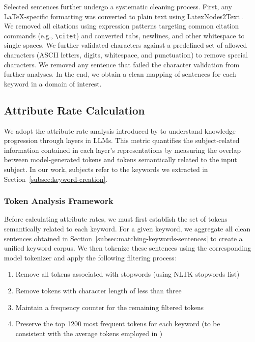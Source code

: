 \documentclass[10pt]{article}
\begin{document}
Selected sentences further undergo a systematic cleaning process. First, any LaTeX-specific formatting was converted to plain text using LatexNodes2Text \citep{faist_pylatexenc_2021}. We removed all citations using expression patterns targeting common citation commands (e.g., \verb|\citet|) and converted tabs, newlines, and other whitespace to single spaces. We further validated characters against a predefined set of allowed characters (ASCII letters, digits, whitespace, and punctuation) to remove special characters. We removed any sentence that failed the character validation from further analyses. In the end, we obtain a clean mapping of sentences for each keyword in a domain of interest.




\subsection{Attribute Rate Calculation}
\label{subsec:attribution-rate}

We adopt the attribute rate analysis introduced by \citet{geva2023dissecting} to understand knowledge progression through layers in LLMs. This metric quantifies the subject-related information contained in each layer's representations by measuring the overlap between model-generated tokens and tokens semantically related to the input subject. In our work, subjects refer to the keywords we extracted in Section~\ref{subsec:keyword-creation}.

\subsubsection{Token Analysis Framework}
\label{subsec:token-analysis}

Before calculating attribute rates, we must first establish the set of tokens semantically related to each keyword. For a given keyword, we aggregate all clean sentences obtained in Section~\ref{subsec:matching-keywords-sentences} to create a unified keyword corpus. We then tokenize these sentences using the corresponding model tokenizer and apply the following filtering process:

\begin{enumerate}
    \item Remove all tokens associated with stopwords (using NLTK stopwords list)
    \item Remove tokens with character length of less than three
    \item Maintain a frequency counter for the remaining filtered tokens
    \item Preserve the top 1200 most frequent tokens for each keyword (to be consistent with the average tokens employed in \cite{geva2023dissecting})
\end{enumerate}
\end{document}
